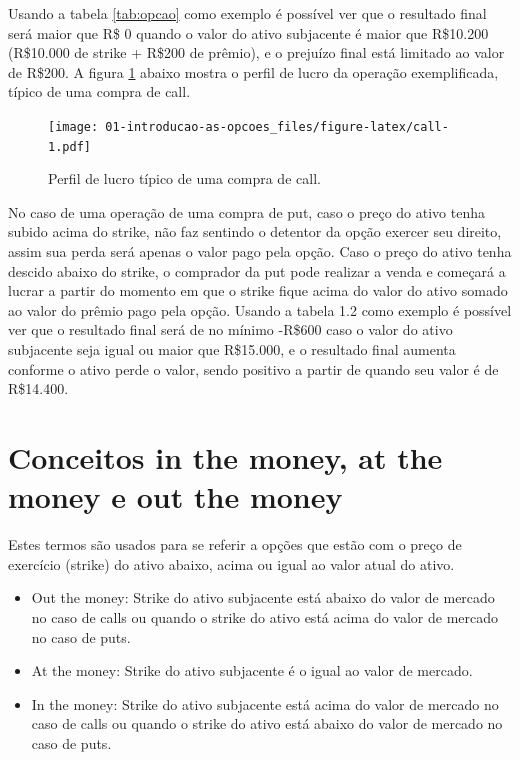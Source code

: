 \documentclass[]{book}
\providecommand{\tightlist}{%
  \setlength{\itemsep}{0pt}\setlength{\parskip}{0pt}}
\theoremstyle{definition}
\theoremstyle{definition}
\theoremstyle{definition}
\theoremstyle{remark}
\begin{document}
Usando a tabela \ref{tab:opcao} como exemplo é possível ver que o
resultado final será maior que R\$ 0 quando o valor do ativo subjacente
é maior que R\$10.200 (R\$10.000 de strike + R\$200 de prêmio), e o
prejuízo final está limitado ao valor de R\$200. A figura \ref{fig:call}
abaixo mostra o perfil de lucro da operação exemplificada, típico de uma
compra de call.

\begin{figure}
\centering
\texttt{[image: 01-introducao-as-opcoes\_files/figure-latex/call-1.pdf]}
\caption{\label{fig:call}Perfil de lucro típico de uma compra de call.}
\end{figure}

No caso de uma operação de uma compra de put, caso o preço do ativo
tenha subido acima do strike, não faz sentindo o detentor da opção
exercer seu direito, assim sua perda será apenas o valor pago pela
opção. Caso o preço do ativo tenha descido abaixo do strike, o comprador
da put pode realizar a venda e começará a lucrar a partir do momento em
que o strike fique acima do valor do ativo somado ao valor do prêmio
pago pela opção. Usando a tabela 1.2 como exemplo é possível ver que o
resultado final será de no mínimo -R\$600 caso o valor do ativo
subjacente seja igual ou maior que R\$15.000, e o resultado final
aumenta conforme o ativo perde o valor, sendo positivo a partir de
quando seu valor é de R\$14.400.

\section{Conceitos in the money, at the money e out the
money}\label{conceitos-in-the-money-at-the-money-e-out-the-money}

Estes termos são usados para se referir a opções que estão com o preço
de exercício (strike) do ativo abaixo, acima ou igual ao valor atual do
ativo.

\begin{itemize}
\tightlist
\item
  Out the money: Strike do ativo subjacente está abaixo do valor de
  mercado no caso de calls ou quando o strike do ativo está acima do
  valor de mercado no caso de puts.\\
\item
  At the money: Strike do ativo subjacente é o igual ao valor de
  mercado.
\item
  In the money: Strike do ativo subjacente está acima do valor de
  mercado no caso de calls ou quando o strike do ativo está abaixo do
  valor de mercado no caso de puts.
\end{itemize}
\end{document}
